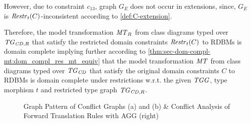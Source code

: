 \begin{example}
\begin{enumerate}
  However, due to constraint $c_{13}$, graph $G_E$ does not occur in extensions, since, $G_E$ is $\mathit{Restr}_t(C)$-inconsistent according to \cref{def:C-extension}.
\end{enumerate}
Therefore, the model transformation $\mathit{MT}_R$ from class diagrams typed over $\mathit{TG}_{\mathit{CD},R}$ that satisfy the restricted domain constraints $\mathit{Restr}_t(C)$ to RDBMs is domain complete implying further according to \cref{thm:sec-dom-compl-mt:dom_compl_res_mt_equiv} that the model transformation $\mathit{MT}$ from class diagrams typed over $\mathit{TG}_\mathit{CD}$ that satisfy the original domain constraints $C$ to RDBMs is domain complete under restrictions w.r.t. the given $\mathit{TGG}$, type morphism $t$ and restricted type graph $\mathit{TG}_{\mathit{CD},R}$.
\envEndMarker
\end{example}

\begin{figure}[!tb]
\begin{center}
\end{center}
\caption{Graph Pattern of Conflict Graphs (a) and (b) \& Conflict Analysis of Forward Translation Rules with AGG (right)}
\label{fig:sec-dom-compl-mt:agg2}
\end{figure}

